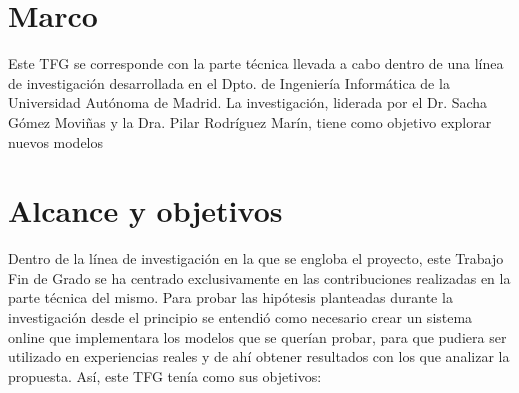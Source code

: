 


\section{Marco}


Este TFG se corresponde con la parte técnica llevada a cabo dentro de una línea de investigación desarrollada en el Dpto. de Ingeniería Informática de la Universidad Autónoma de Madrid. La investigación, liderada por el Dr. Sacha Gómez Moviñas y la Dra. Pilar Rodríguez Marín, tiene como objetivo explorar nuevos modelos %

\section{Alcance y objetivos}


Dentro de la línea de investigación en la que se engloba el proyecto, este Trabajo Fin de Grado se ha centrado exclusivamente en las contribuciones realizadas en la parte técnica del mismo. Para probar las hipótesis planteadas durante la investigación desde el principio se entendió como necesario crear un sistema online que implementara los modelos que se querían probar, para que pudiera ser utilizado en experiencias reales y de ahí obtener resultados con los que analizar la propuesta. Así, este TFG tenía como sus objetivos:

